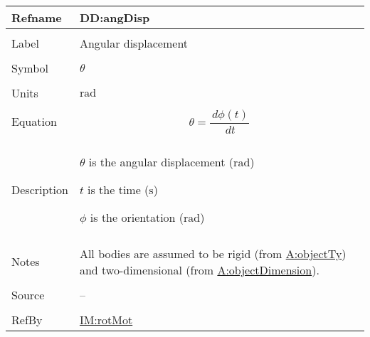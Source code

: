 \documentclass[12pt]{article}
\begin{document}
\vspace{\baselineskip}
\noindent
\begin{minipage}{\textwidth}
\begin{tabular}{>{\raggedright}p{}>{\raggedright\arraybackslash}p{}}
\toprule \textbf{Refname} & \textbf{DD:angDisp}
\label{DD:angDisp}
\\ \midrule \\
Label & Angular displacement
        
\\ \midrule \\
Symbol & $θ$
         
\\ \midrule \\
Units & ${\text{rad}}$
        
\\ \midrule \\
Equation & \begin{displaymath}
           θ=\frac{\,dϕ\left(t\right)}{\,dt}
           \end{displaymath}
\\ \midrule \\
Description & \begin{symbDescription}
              \item{$θ$ is the angular displacement (${\text{rad}}$)}
              \item{$t$ is the time (${\text{s}}$)}
              \item{$ϕ$ is the orientation (${\text{rad}}$)}
              \end{symbDescription}
\\ \midrule \\
Notes & All bodies are assumed to be rigid (from \hyperref[assumpOT]{A:objectTy}) and two-dimensional (from \hyperref[assumpOD]{A:objectDimension}).
        
\\ \midrule \\
Source & --
         
\\ \midrule \\
RefBy & \hyperref[IM:rotMot]{IM:rotMot}
        
\\ \bottomrule
\end{tabular}
\end{minipage}
\end{document}
